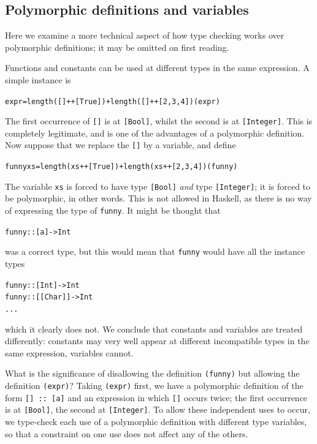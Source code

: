\subsection*{Polymorphic definitions and variables}

Here we examine a more technical aspect of how type checking works over
polymorphic definitions; it may be omitted on first reading.

Functions and constants can be used at different types in the same
expression. A simple instance is
\begin{alltt}
expr = length ([]++[True]) + length ([]++[2,3,4]) \hfill (expr)
\end{alltt}
The first occurrence of \texttt{[]} is at \texttt{[Bool]}, whilst the second is at
\texttt{[Integer]}. This is completely legitimate, and is one of the advantages of
a polymorphic definition.
Now suppose that we replace the \texttt{[]} by a variable, and define
\begin{alltt}
funny xs = length (xs++[True]) + length (xs++[2,3,4]) \hfill (funny)
\end{alltt}
The variable \texttt{xs} is forced to have type \texttt{[Bool]} {\em and\/} type
\texttt{[Integer]}; it is forced to be polymorphic, in other words. This is
not allowed in Haskell, as there is no way of expressing the type of 
\texttt{funny}. It might be thought that
\begin{alltt}
funny :: [a] -> Int
\end{alltt}
was a correct type, but this would mean that \texttt{funny} would have all
the instance types
\begin{alltt}
funny :: [Int] -> Int
funny :: [[Char]] -> Int
  ...
\end{alltt}
which it clearly does not. We conclude that constants and variables are
treated differently: constants may very well appear at different
incompatible types in the same expression, variables cannot. 

What is the significance of disallowing the definition \texttt{(funny)} but
allowing the definition \texttt{(expr)}? Taking \texttt{(expr)} first, we have a polymorphic
definition of the form
\texttt{[] ::\ [a]}
and an expression in which 
\texttt{[]} occurs twice; the first occurrence is at \texttt{[Bool]}, the second at 
\texttt{[Integer]}. To allow these independent uses to occur, we
type-check each use
of a polymorphic definition with different type variables, so
that a constraint on one use does not affect any of the others.

